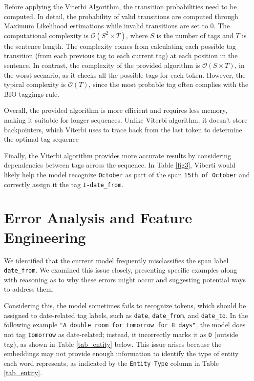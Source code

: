 \documentclass[11pt,a4paper]{article}
\begin{document}
Before applying the Viterbi Algorithm, the transition probabilities need to be computed. In detail, the probability of valid transitions are computed through Maximum Likelihood estimations while invalid transitions are set to 0. The computational complexity is $\mathcal{O}(S^2 \times T)$, where $S$ is the number of tags and $T$ is the sentence length. The complexity comes from calculating each possible tag transition (from each previous tag to each current tag) at each position in the sentence. In contrast, the complexity of the provided algorithm is $\mathcal{O}(S \times T)$, in the worst scenario, as it checks all the possible tags for each token. However, the typical complexity is $\mathcal{O}(T)$, since the most probable tag often complies with the BIO taggings rule.

Overall, the provided algorithm is more efficient and requires less memory, making it suitable for longer sequences. Unlike Viterbi algorithm, it doesn’t store backpointers, which Viterbi uses to trace back from the last token to determine the optimal tag sequence

Finally, the Viterbi algorithm provides more accurate results by considering dependencies between tags across the sequence. In Table \ref{fig3}, Viberti would likely help the model recognize \texttt{October} as part of the span \texttt{15th of October} and correctly assign it the tag \texttt{I-date\_from}.


\pagebreak
\section{Error Analysis and Feature Engineering}

We identified that the current model frequently misclassifies the span label \texttt{date\_from}. We examined this issue closely, presenting specific examples along with reasoning as to why these errors might occur and suggesting potential ways to address them.

Considering this, the model sometimes fails to recognize tokens, which should be assigned to date-related tag labels, such as 
\texttt{date}, \texttt{date\_from}, and \texttt{date\_to}. In the following example \texttt{"A double room for tomorrow for 8 days"}, the model does not tag \texttt{tomorrow} as date-related; instead, it incorrectly marks it as \texttt{O} (outside tag), as shown in Table \ref{tab_entity} below. This issue arises because the embeddings may not provide enough information to identify the type of entity each word represents, as indicated by the \texttt{Entity Type} column in Table \ref{tab_entity}.
\end{document}

